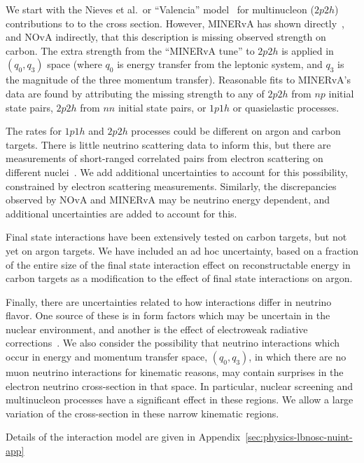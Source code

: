 We start with the Nieves et al.\ or ``Valencia'' model~\cite{nieves1,nieves2} for multinucleon ($2p2h$) contributions to to the cross section.  However, MINERvA has shown directly~\cite{Rodrigues:2015hik}, and NOvA indirectly, that this description is missing observed strength on carbon. The extra strength from the ``MINERvA tune'' to $2p2h$ is applied in $(q_0,q_3)$ space (where $q_0$ is energy transfer from the leptonic system, and $q_3$ is the magnitude of the three momentum transfer). Reasonable fits to MINERvA's data are found by attributing the missing strength to any of $2p2h$ from $np$ initial state pairs, $2p2h$ from $nn$ initial state pairs, or $1p1h$ or quasielastic processes.  

The rates for $1p1h$ and $2p2h$ processes could be different on argon and carbon targets.  There is little neutrino scattering data to inform this, but there are measurements of short-ranged correlated pairs from electron scattering on different nuclei~\cite{Colle:2015ena}.   We add additional uncertainties to account for this possibility, constrained by electron scattering measurements.  Similarly, the discrepancies observed by NOvA and MINERvA may be neutrino energy dependent, and additional uncertainties are added to account for this.

Final state interactions have been extensively tested on carbon targets, but not yet on argon targets.  We have included an ad hoc uncertainty, based on a fraction of the entire size of the final state interaction effect on reconstructable energy in carbon targets as a modification to the effect of final state interactions on argon.

Finally, there are uncertainties related to how interactions differ in neutrino flavor.  One source of these is in form factors which may be uncertain in the nuclear environment, and another is the effect of electroweak radiative corrections~\cite{Day-McFarland:2012}.  We also consider the possibility that neutrino interactions which occur in energy and momentum transfer space, $(q_0,q_3)$, in which there are no muon neutrino interactions for kinematic reasons, may contain surprises in the electron neutrino cross-section in that space.  In particular, nuclear screening and multinucleon processes have a significant effect in these regions.  We allow a large variation of the cross-section in these narrow kinematic regions.

Details of the interaction model are given in Appendix~\ref{sec:physics-lbnosc-nuint-app}


